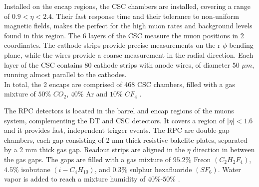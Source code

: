 Installed on the encap regions, the CSC chambers are installed, covering a range of $0.9<\eta<2.4$. Their fast response time and their tolerance to non-uniform magnetic fields, makes the perfect for the high muon rates and background levels found in this region. The 6 layers of the CSC measure the muon positions in 2 coordinates. The cathode strips provide precise measurements on the r-$\phi$ bending plane, while the wires provide a coarse measurement in the radial direction. Each layer of the CSC contains 80 cathode strips with anode wires, of diameter 50 $\mu m$, running almost parallel to the cathodes.\\
In total, the 2 encaps are comprised of 468 CSC chambers, filled with a gas mixture of $50\%$ $CO_2$, $40\%$ Ar and $10\%$ $CF_4$ \cite{cms7}.

The RPC detectors is located in the barrel and encap regions of the muons system, complementing the DT and CSC detectors. It covers a region of $|\eta|<1.6$ and it provides fast, independent trigger events. The RPC are double-gap chambers, each gap consisting of 2 mm thick resistive bakelite plates, separated by a 2 mm thick gas gap.  Readout strips are aligned in the $\eta$ direction in between the gas gaps. The gaps are filled with a gas mixture of $95.2\%$ Freon $(C_2H_2F_4)$, $4.5\%$ isobutane $(i-C_4H_{10})$, and $0.3\%$ sulphur hexafluoride $(SF_6)$. Water vapor is added to reach a mixture humidity of $40\%$-$50\%$ \cite{cms7}. 




